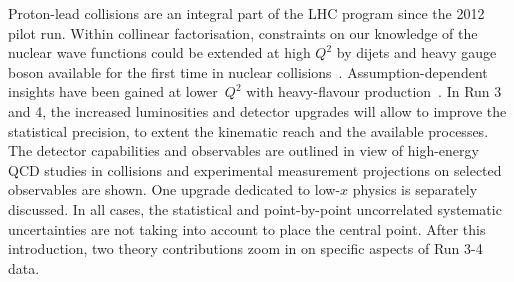 \documentclass[../report.tex]{subfiles}
\begin{document}
Proton-lead  collisions are an integral part of the LHC program since the 2012 pilot run. Within collinear factorisation, constraints on our knowledge of the nuclear wave functions could be extended at high $Q^2$ by dijets and heavy gauge boson available for the first time in nuclear collisions~\cite{Eskola:2016oht}. Assumption-dependent insights have been gained at lower~$Q^2$ with heavy-flavour production~\cite{Kusina:2017gkz}.  In Run 3 and 4, the increased luminosities and detector upgrades  will allow to improve  the statistical precision, to extent the kinematic reach and the available processes. %
The detector capabilities and observables are outlined in view of high-energy QCD studies in \pPb collisions and experimental measurement projections on selected observables are shown. One upgrade dedicated to low-$x$ physics is separately discussed. In all cases, the statistical and point-by-point uncorrelated systematic uncertainties are not taking into account to place the central point.  After this introduction, two theory contributions zoom in on specific aspects of Run 3-4 data. 
\end{document}
